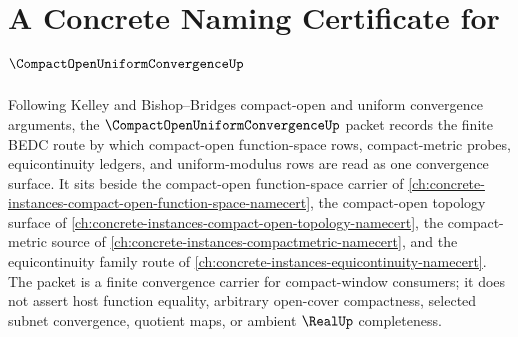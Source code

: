 \chapter{A Concrete Naming Certificate for $\CompactOpenUniformConvergenceUp$}
\label{ch:concrete-instances-compact-open-uniform-convergence-namecert}

Following Kelley and Bishop--Bridges compact-open and uniform convergence arguments, the $\CompactOpenUniformConvergenceUp$ packet records the finite BEDC route by which compact-open function-space rows, compact-metric probes, equicontinuity ledgers, and uniform-modulus rows are read as one convergence surface. It sits beside the compact-open function-space carrier of \autoref{ch:concrete-instances-compact-open-function-space-namecert}, the compact-open topology surface of \autoref{ch:concrete-instances-compact-open-topology-namecert}, the compact-metric source of \autoref{ch:concrete-instances-compactmetric-namecert}, and the equicontinuity family route of \autoref{ch:concrete-instances-equicontinuity-namecert}. The packet is a finite convergence carrier for compact-window consumers; it does not assert host function equality, arbitrary open-cover compactness, selected subnet convergence, quotient maps, or ambient $\RealUp$ completeness.

